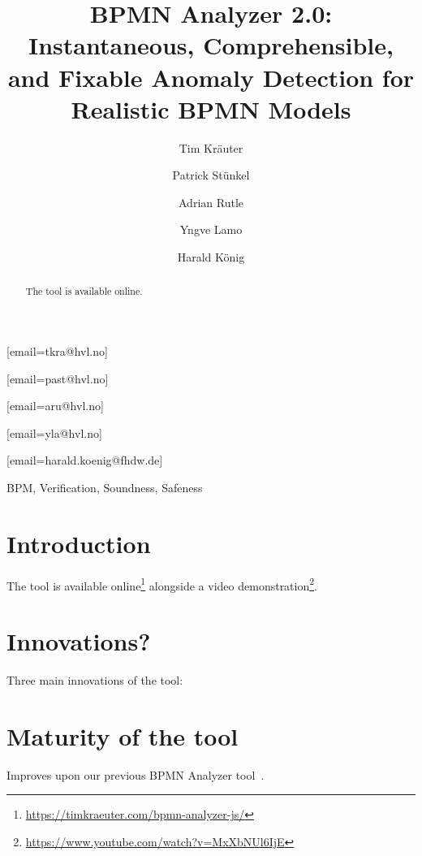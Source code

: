 \documentclass[
twocolumn,
]{ceurart}
\begin{document}


\title{BPMN Analyzer 2.0: Instantaneous, Comprehensible, and Fixable Anomaly Detection for Realistic BPMN Models}

\author[1]{Tim Kräuter}
[email=tkra@hvl.no]
\author[1]{Patrick Stünkel}
[email=past@hvl.no] %
\author[1]{Adrian Rutle}
[email=aru@hvl.no]
\author[1]{Yngve Lamo}
[email=yla@hvl.no]
\author[2,1]{Harald König}
[email=harald.koenig@fhdw.de]
\address[1]{Western Norway University of Applied Sciences, Bergen, Norway}
\address[2]{FHDW Hannover, Germany}

\begin{abstract}
  The tool is available online.
\end{abstract}

\begin{keywords}
BPM,
Verification,
Soundness,
Safeness
\end{keywords}

\maketitle


\section{Introduction}
The tool is available online\footnote{\url{https://timkraeuter.com/bpmn-analyzer-js/}} alongside a video demonstration\footnote{\url{https://www.youtube.com/watch?v=MxXbNUl6IjE}}.

\section{Innovations?} %
Three main innovations of the tool:

\section{Maturity of the tool}
Improves upon our previous BPMN Analyzer tool~\cite{krauterFormalizationAnalysisBPMN2023}.
\end{document}
